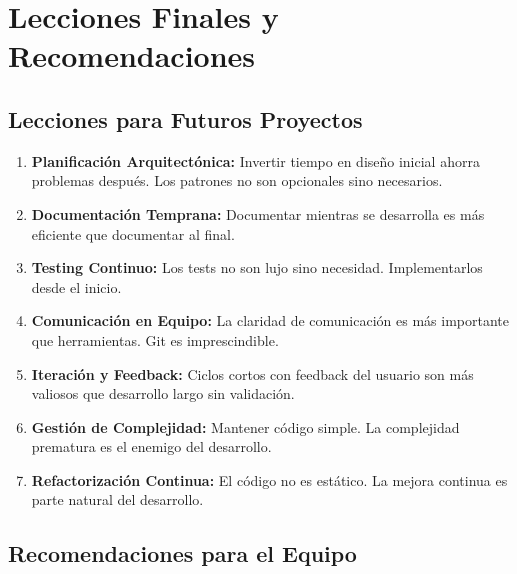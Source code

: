 \documentclass[12pt, a4paper]{article}
\begin{document}
\section{Lecciones Finales y Recomendaciones}

\subsection{Lecciones para Futuros Proyectos}

\begin{enumerate}[leftmargin=2em]
    \item \textbf{Planificación Arquitectónica:} Invertir tiempo en diseño inicial ahorra problemas después. Los patrones no son opcionales sino necesarios.
    
    \item \textbf{Documentación Temprana:} Documentar mientras se desarrolla es más eficiente que documentar al final.
    
    \item \textbf{Testing Continuo:} Los tests no son lujo sino necesidad. Implementarlos desde el inicio.
    
    \item \textbf{Comunicación en Equipo:} La claridad de comunicación es más importante que herramientas. Git es imprescindible.
    
    \item \textbf{Iteración y Feedback:} Ciclos cortos con feedback del usuario son más valiosos que desarrollo largo sin validación.
    
    \item \textbf{Gestión de Complejidad:} Mantener código simple. La complejidad prematura es el enemigo del desarrollo.
    
    \item \textbf{Refactorización Continua:} El código no es estático. La mejora continua es parte natural del desarrollo.
\end{enumerate}

\subsection{Recomendaciones para el Equipo}
\end{document}
